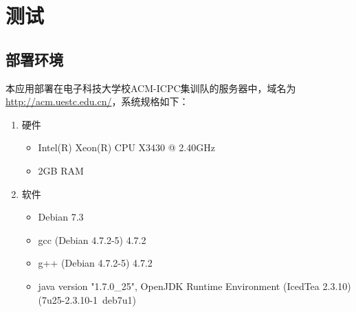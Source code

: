 
\chapter{测试}
\section{部署环境}
本应用部署在电子科技大学校ACM-ICPC集训队的服务器中，域名为\url{http://acm.uestc.edu.cn/}，系统规格如下：
\begin{enumerate}
	\item 硬件
	\begin{itemize}
		\item Intel(R) Xeon(R) CPU X3430 @ 2.40GHz
		\item 2GB RAM
	\end{itemize}
	\item 软件
	\begin{itemize}
		\item Debian 7.3
		\item gcc (Debian 4.7.2-5) 4.7.2
		\item g++ (Debian 4.7.2-5) 4.7.2
		\item java version "1.7.0\_25", OpenJDK Runtime Environment (IcedTea 2.3.10) (7u25-2.3.10-1~deb7u1)
	\end{itemize}
\end{enumerate}